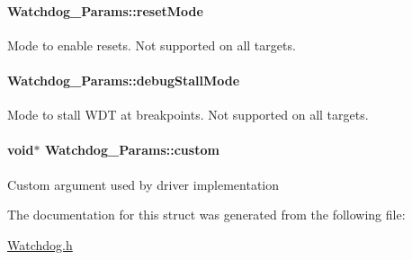 \paragraph[{reset\-Mode}]{ Watchdog\-\_\-\-Params\-::reset\-Mode}\label{struct_watchdog___params_a94b5d650f8beb7dce719360404039ccf}
Mode to enable resets. Not supported on all targets. 
\paragraph[{debug\-Stall\-Mode}]{ Watchdog\-\_\-\-Params\-::debug\-Stall\-Mode}\label{struct_watchdog___params_abe7792eef8afa2972a4625f428b7241b}
Mode to stall W\-D\-T at breakpoints. Not supported on all targets. 
\paragraph[{custom}]{\setlength{\rightskip}{0pt plus 5cm}void$\ast$ Watchdog\-\_\-\-Params\-::custom}\label{struct_watchdog___params_aa2d75e83d9cb6bf71400934b709ec234}
Custom argument used by driver implementation 

The documentation for this struct was generated from the following file\-:\begin{DoxyCompactItemize}
\item 
\hyperlink{_watchdog_8h}{Watchdog.\-h}\end{DoxyCompactItemize}
